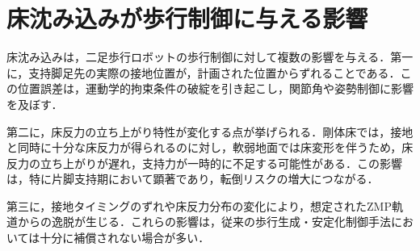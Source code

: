 \section{床沈み込みが歩行制御に与える影響}

床沈み込みは，二足歩行ロボットの歩行制御に対して複数の影響を与える．第一に，支持脚足先の実際の接地位置が，計画された位置からずれることである．この位置誤差は，運動学的拘束条件の破綻を引き起こし，関節角や姿勢制御に影響を及ぼす．

第二に，床反力の立ち上がり特性が変化する点が挙げられる．剛体床では，接地と同時に十分な床反力が得られるのに対し，軟弱地面では床変形を伴うため，床反力の立ち上がりが遅れ，支持力が一時的に不足する可能性がある．この影響は，特に片脚支持期において顕著であり，転倒リスクの増大につながる．

第三に，接地タイミングのずれや床反力分布の変化により，想定されたZMP軌道からの逸脱が生じる．これらの影響は，従来の歩行生成・安定化制御手法においては十分に補償されない場合が多い．